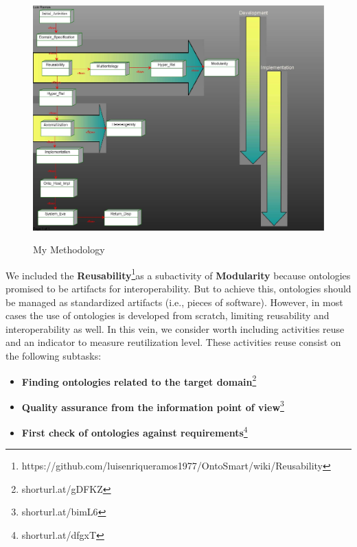 \begin{figure}
	\begin{center}
		\includegraphics[scale=0.7,angle=90, totalheight = 0.8\textheight, trim=0.3cm 0.3cm 0.3cm 0.3cm, clip=true]{figure-chapterIII/figure3-22}\\
		\caption{My Methodology}
		\label{figure3-1}
	\end{center}
\end{figure}

 
We included the \textbf{Reusability}\footnote{https://github.com/luisenriqueramos1977/OntoSmart/wiki/Reusability}as a subactivity of \textbf{Modularity} because ontologies promised to be artifacts for interoperability. But to achieve this, ontologies should be managed as standardized artifacts (i.e., pieces of software). However, in most cases the use of ontologies is developed from scratch, limiting reusability and interoperability as well. In this vein, we consider worth including activities reuse and an indicator to measure reutilization level. These activities reuse consist on the following subtasks:

\begin{itemize}
	
	\item \textbf{Finding ontologies related to the target domain}\footnote{shorturl.at/gDFKZ}
	
	\item \textbf{Quality  assurance from the information point of view}\footnote{shorturl.at/bimL6}
	
	\item \textbf{First check of ontologies against requirements}\footnote{shorturl.at/dfgxT}
	
\end{itemize}


